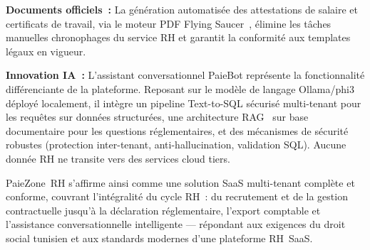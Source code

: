 \textbf{Documents officiels~:} La génération automatisée des
attestations de salaire et certificats de travail, via le moteur
PDF Flying Saucer~\cite{flyingsaucer}, élimine les tâches manuelles chronophages du
service RH et garantit la conformité aux templates légaux en vigueur.

\textbf{Innovation IA~:} L'assistant conversationnel PaieBot
représente la fonctionnalité différenciante de la plateforme.
Reposant sur le modèle de langage Ollama/phi3~\cite{ollama,phi3} déployé localement,
il intègre un pipeline Text-to-SQL sécurisé multi-tenant pour les
requêtes sur données structurées, une architecture RAG~\cite{rag} sur base
documentaire pour les questions réglementaires, et des mécanismes
de sécurité robustes (protection inter-tenant, anti-hallucination,
validation SQL). Aucune donnée RH ne transite vers des services
cloud tiers.

PaieZone~RH s'affirme ainsi comme une solution SaaS multi-tenant
complète et conforme, couvrant l'intégralité du cycle RH~:
du recrutement et de la gestion contractuelle jusqu'à la
déclaration réglementaire, l'export comptable et l'assistance
conversationnelle intelligente --- répondant aux exigences
du droit social tunisien et aux standards modernes d'une
plateforme RH~SaaS.


